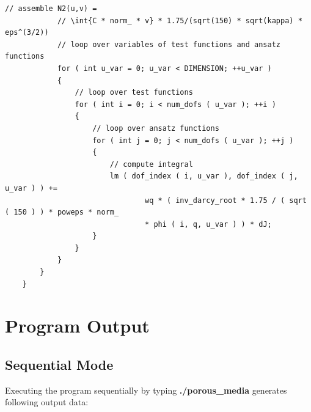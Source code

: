 \documentclass{article}
\begin{document}
\begin{lstlisting}[firstnumber=264]
            // assemble N2(u,v) =
            // \int{C * norm_ * v} * 1.75/(sqrt(150) * sqrt(kappa) * eps^(3/2))
            // loop over variables of test functions and ansatz functions
            for ( int u_var = 0; u_var < DIMENSION; ++u_var )
            {
                // loop over test functions
                for ( int i = 0; i < num_dofs ( u_var ); ++i )
                {
                    // loop over ansatz functions
                    for ( int j = 0; j < num_dofs ( u_var ); ++j )
                    {
                        // compute integral
                        lm ( dof_index ( i, u_var ), dof_index ( j, u_var ) ) +=
                                wq * ( inv_darcy_root * 1.75 / ( sqrt ( 150 ) ) * poweps * norm_
                                * phi ( i, q, u_var ) ) * dJ;
                    }
                }
            }
        }
    }
\end{lstlisting}

\pagebreak

\section{Program Output}
\label{ch:output}

\subsection{Sequential Mode}

Executing the program sequentially by typing \textbf{./porous\_media} generates following output data:
\end{document}
